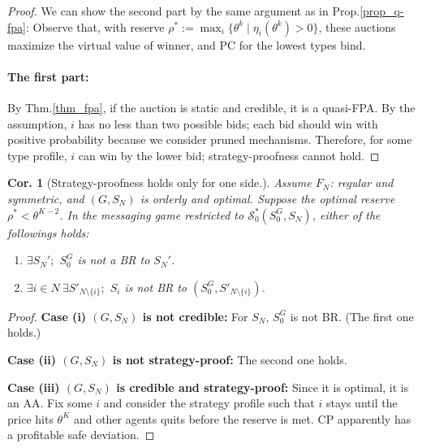 \documentclass[11pt,a4paper,dvipdfmx]{article}
\theoremstyle{plain}
\newtheorem{cor}{Cor.}[section]
\newcommand{\mS}{\mathcal{S}}
\newcommand{\1}{\mathbbm{1}}
\begin{document}
\begin{proof}
	We can show the second part by the same argument as in Prop.\ref{prop_q-fpa}: Observe that, with reserve $\rho^* := \max_i\{\theta^k \mid \eta_i(\theta^k) > 0\}$, these auctions maximize the virtual value of winner, and PC for the lowest types bind.
	
	\paragraph{The first part:}
	By Thm.\ref{thm_fpa}, if the auction is static and credible, it is a quasi-FPA. By the assumption, $i$ has no less than two possible bids; each bid should win with positive probability because we consider pruned mechanisms. Therefore, for some type profile, $i$ can win by the lower bid; strategy-proofness cannot hold.
\end{proof}

\begin{cor}[Strategy-proofness holds only for one side.]
	Assume $F_N$: regular and symmetric, and $(G, S_N)$ is orderly and optimal. Suppose the optimal reserve $\rho^* < \theta^{K-2}$. In the messaging game restricted to $\mS_0^*(S_0^G, S_N)$, either of the followings holds:
	\begin{enumerate}
		\item $\exists S_N';$ $S_0^G$ is not a BR to $S_N'$.
		\item $\exists i \in N \ \exists S'_{N \setminus \{i\}};$ $S_i$ is not BR to $(S_0^G, S'_{N \setminus \{i\}})$.
	\end{enumerate}
\end{cor}
\begin{proof}
	\textbf{Case (i) $(G, S_N)$ is not credible:} For $S_N$, $S_0^G$ is not BR. (The first one holds.)
	
	\noindent
	\textbf{Case (ii) $(G, S_N)$ is not strategy-proof:} The second one holds.
	
	\noindent
	\textbf{Case (iii) $(G, S_N)$ is credible and strategy-proof:}
	Since it is optimal, it is an AA. Fix some $i$ and consider the strategy profile such that $i$ stays until the price hits $\theta^K$ and other agents quits before the reserve is met. CP apparently has a profitable safe deviation.
	
\end{proof}
\end{document}
